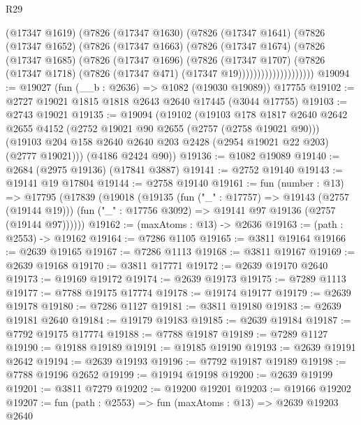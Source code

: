 \begin{lexlean}{R29}
\begin{coremodule}
                      (@17347 @1619)
                      (@7826
                        (@17347 @1630)
                        (@7826
                          (@17347 @1641)
                          (@7826
                            (@17347 @1652)
                            (@7826
                              (@17347 @1663)
                              (@7826
                                (@17347 @1674)
                                (@7826
                                  (@17347 @1685)
                                  (@7826
                                    (@17347 @1696)
                                    (@7826
                                      (@17347 @1707)
                                      (@7826
                                        (@17347 @1718)
                                        (@7826 (@17347 @471) (@17347 @19))))))))))))))))))))
@19094 := @19027 (fun (__b : @2636) => @1082 (@19030 @19089)) @17755
@19102 := @2727 @19021 @1815 @1818 @2643 @2640 @17445 (@3044 @17755)
@19103 := @2743 @19021
@19135 := @19094
    (@19102
      (@19103
        @178
        @1817
        @2640
        @2642
        @2655
        @4152
        (@2752 @19021 @90 @2655 (@2757 (@2758 @19021 @90)))
        (@19103 @204 @158 @2640 @2640 @203 @2428 (@2954 @19021 @22 @203) (@2777 @19021)))
      (@4186 @2424 @90))
@19136 := @1082 @19089
@19140 := @2684 (@2975 @19136) (@17841 @3887)
@19141 := @2752 @19140
@19143 := @19141 @19 @17804
@19144 := @2758 @19140
@19161 := fun (number : @13) =>
  @17795
    (@17839
      (@19018
        (@19135
          (fun ("_" : @17757) => @19143 (@2757 (@19144 @19)))
          (fun ("_" : @17756 @3092) => @19141 @97 @19136 (@2757 (@19144 @97))))))
@19162 := (maxAtoms : @13) -> @2636
@19163 := (path : @2553) -> @19162
@19164 := @7286 @1105
@19165 := @3811 @19164
@19166 := @2639 @19165
@19167 := @7286 @1113
@19168 := @3811 @19167
@19169 := @2639 @19168
@19170 := @3811 @17771
@19172 := @2639 @19170 @2640
@19173 := @19169 @19172
@19174 := @2639 @19173
@19175 := @7289 @1113
@19177 := @7788 @19175 @17774
@19178 := @19174 @19177
@19179 := @2639 @19178
@19180 := @7286 @1127
@19181 := @3811 @19180
@19183 := @2639 @19181 @2640
@19184 := @19179 @19183
@19185 := @2639 @19184
@19187 := @7792 @19175 @17774
@19188 := @7788 @19187
@19189 := @7289 @1127
@19190 := @19188 @19189
@19191 := @19185 @19190
@19193 := @2639 @19191 @2642
@19194 := @2639 @19193
@19196 := @7792 @19187 @19189
@19198 := @7788 @19196 @2652
@19199 := @19194 @19198
@19200 := @2639 @19199
@19201 := @3811 @7279
@19202 := @19200 @19201
@19203 := @19166 @19202
@19207 := fun (path : @2553) => fun (maxAtoms : @13) => @2639 @19203 @2640

\end{coremodule}
\end{lexlean}
